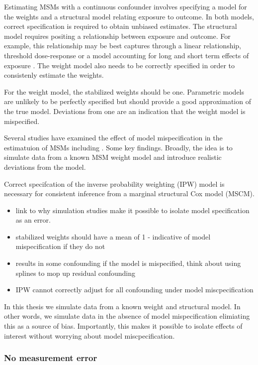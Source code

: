 \documentclass[11pt]{article}
\providecommand{\tightlist}{%
      \setlength{\itemsep}{0pt}\setlength{\parskip}{0pt}}
\begin{document}
Estimating MSMs with a continuous confounder involves specifying a model
for the weights and a structural model relating exposure to outcome. In
both models, correct specification is required to obtain unbiased
estimates. The structural model requires positing a relationship between
exposure and outcome. For example, this relationship may be best
captures through a linear relationship, threshold dose-response or a
model accounting for long and short term effects of exposure
\citet{Cole2009}. The weight model also needs to be correctly specified
in order to consistenly estimate the weights.

For the weight model, the stabilized weights should be one. Parametric
models are unlikely to be perfectly specified but should provide a good
approximation of the true model. Deviations from one are an indication
that the weight model is mispecified.

Several studies have examined the effect of model mispecification in the
estimatuion of MSMs including \citet{Cole2009}. Some key findings.
Broadly, the idea is to simulate data from a known MSM weight model and
introduce realistic deviations from the model.

Correct specifcation of the inverse probability weighting (IPW) model is
necessary for consistent inference from a marginal structural Cox model
(MSCM).

\begin{itemize}
\tightlist
\item
  link to why simulation studies make it possible to isolate model
  specification as an error.
\item
  stabilized weights should have a mean of 1 - indicative of model
  mispecification if they do not
\item
  results in some confounding if the model is mispecified, think about
  using splines to mop up residual confounding
\item
  IPW cannot correctly adjust for all confounding under model
  miscpecification
\end{itemize}

In this thesis we simulate data from a known weight and structural
model. In other words, we simulate data in the absence of model
mispecification elimiating this as a source of bias. Importantly, this
makes it possible to isolate effects of interest without worrying about
model miscpecification.

\subsubsection{No measurement error}\label{no-measurement-error}
\end{document}

